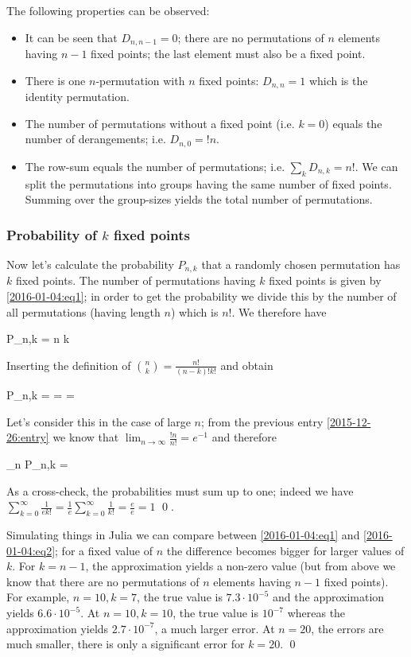 The following properties can be observed:

\begin{itemize}
\item  It can be seen that $D_{n,n-1} = 0$; there are no permutations of $n$ elements having $n-1$ fixed points; the last element must also be a fixed point.
\item  There is one $n$-permutation with $n$ fixed points: $D_{n,n} = 1$ which is the identity permutation.
\item  The number of permutations without a fixed point (i.e. $k=0$) equals the number of derangements; i.e. $D_{n,0} = !n$.
\item  The row-sum equals the number of permutations; i.e. $\sum_{k} D_{n,k} = n!$. We can split the permutations into groups having the same number of fixed points. Summing over the group-sizes yields the total number of permutations.
\end{itemize}

\subsubsection{Probability of $k$ fixed points}

Now let's calculate the probability $P_{n,k}$ that a randomly chosen permutation has $k$ fixed points. The number of permutations having $k$ fixed points is given by \eqref{2016-01-04:eq1}; in order to get the probability we divide this by the number of all permutations (having length $n$) which is $n!$. We therefore have

\bee
P_{n,k} = {n \choose k} 
\eee

Inserting the definition of ${n \choose k} = \frac{n!}{(n-k)! k!}$ and obtain

\be\label{2016-01-04:eq2}
P_{n,k} =   =  =  
\ee

Let's consider this in the case of large $n$; from the previous entry \ref{2015-12-26:entry} we know that $\lim_{n \rightarrow \infty} \frac{!n}{n!} = e^{-1}$ and therefore

\be\label{2016-01-04:eq2}
\lim_{n \rightarrow \infty} P_{n,k} = 
\ee

As a cross-check, the probabilities must sum up to one; indeed we have $\sum_{k=0}^\infty \frac{1}{e k!} = \frac{1}{e} \sum_{k=0}^\infty \frac{1}{k!} = \frac{e}{e} = 1$ \qed.

Simulating things in Julia we can compare between \eqref{2016-01-04:eq1} and \eqref{2016-01-04:eq2}; for a fixed value of $n$ the difference becomes bigger for larger values of $k$. For $k=n-1$, the approximation yields a non-zero value (but from above we know that there are no permutations of $n$ elements having $n-1$ fixed points). For example, $n = 10, k=7$, the true value is $7.3 \cdot 10^{-5}$ and the approximation yields $6.6 \cdot 10^{-5}$. At $n = 10, k=10$, the true value is $10^{-7}$ whereas the approximation yields $2.7 \cdot 10^{-7}$, a much larger error. At $n=20$, the errors are much smaller, there is only a significant error for $k=20$. \qed

